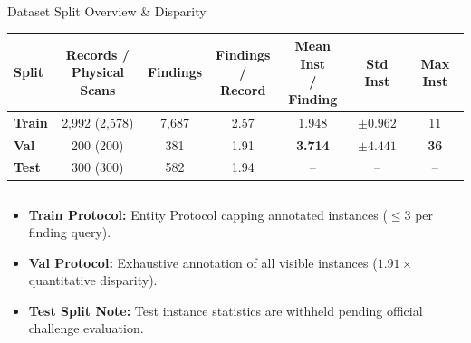 \documentclass[aspectratio=169, 10pt]{beamer}
\begin{document}
\begin{frame}{Dataset Split Overview \& Disparity}
    \centering
    \small
    \begin{tabular}{lcccccc}
        \toprule
        \textbf{Split} & \makecell{\textbf{Records /}\\\textbf{Physical Scans}} & \textbf{Findings} & \makecell{\textbf{Findings}\\\textbf{/ Record}} & \makecell{\textbf{Mean Inst}\\\textbf{/ Finding}} & \textbf{Std Inst} & \textbf{Max Inst} \\
        \midrule
        \textbf{Train} & 2,992 (2,578) & 7,687 & 2.57 & 1.948 & $\pm 0.962$ & 11 \\
        \rowcolor{darkblue!10}
        \textbf{Val}   & 200 (200)     & 381   & 1.91 & \textbf{3.714} & $\pm 4.441$ & \textbf{36} \\
        \textbf{Test}  & 300 (300)     & 582   & 1.94 & -- & -- & -- \\
        \bottomrule
    \end{tabular}

    \vspace{1.0em}
    \begin{columns}[c]
        \begin{column}{0.95\textwidth}
            \begin{itemize}
                \item \textbf{Train Protocol:} Entity Protocol capping annotated instances ($\le 3$ per finding query).
                \item \textbf{Val Protocol:} Exhaustive annotation of all visible instances ($1.91\times$ quantitative disparity).
                \item \textbf{Test Split Note:} Test instance statistics are withheld pending official challenge evaluation.
            \end{itemize}
        \end{column}
    \end{columns}

\end{frame}
\end{document}
